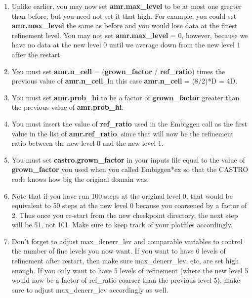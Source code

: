 \begin{enumerate}

\item Unlike earlier, you may now set {\bf amr.max\_level} to be at most one greater than before,
but you need not set it that high.  For example, you could set {\bf amr.max\_level} the same as before
and you would lose data at the finest refinement level.   You may not set {\bf amr.max\_level} = 0,
however, because we have no data at the new level 0 until we average down from the new level 1 after
the restart.

\item You must set {\bf amr.n\_cell} = ({\bf grown\_factor} / {\bf ref\_ratio}) times the previous 
value of {\bf amr.n\_cell}.  In this case {\bf amr.n\_cell} = (8/2)*D = 4D.

\item You must set {\bf amr.prob\_hi} to be a factor of {\bf grown\_factor} greater than the previous 
value of {\bf amr.prob\_hi}.

\item You must insert the value of {\bf ref\_ratio} used in the Embiggen call as the first
value in the list of {\bf amr.ref\_ratio}, since that will now be the refinement ratio between 
the new level 0 and the new level 1.

\item You must set {\bf castro.grown\_factor} in your inputs file equal to the value of 
{\bf grown\_factor} you used when you called Embiggen*ex so that the CASTRO code knows 
how big the original domain was.

\item Note that if you have run 100 steps at the original level 0, that would be equivalent
to 50 steps at the new level 0 because you coarsened by a factor of 2.  
Thus once you re-start from the new checkpoint directory,
the next step will be 51, not 101.  Make sure to keep track of your plotfiles accordingly.

\item Don't forget to adjust max\_denerr\_lev and comparable variables to control
the number of fine levels you now want.   If you want to have 6 levels of refinement
after restart, then make sure max\_denerr\_lev, etc, are set high enough.  If you
only want to have 5 levels of refinement (where the new level 5 would now be
a factor of ref\_ratio coarser than the previous level 5), make sure to adjust
max\_denerr\_lev accordingly as well.

\end{enumerate}
   
